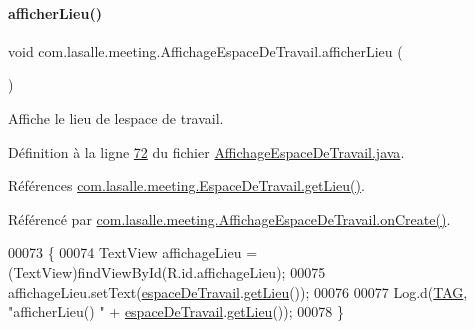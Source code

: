 \paragraph{\texorpdfstring{afficher\+Lieu()}{afficherLieu()}}
{\footnotesize\ttfamily void com.\+lasalle.\+meeting.\+Affichage\+Espace\+De\+Travail.\+afficher\+Lieu (\begin{DoxyParamCaption}{ }\end{DoxyParamCaption})}



Affiche le lieu de l\textquotesingle{}espace de travail. 



Définition à la ligne \hyperlink{_affichage_espace_de_travail_8java_source_l00072}{72} du fichier \hyperlink{_affichage_espace_de_travail_8java_source}{Affichage\+Espace\+De\+Travail.\+java}.



Références \hyperlink{_espace_de_travail_8java_source_l00092}{com.\+lasalle.\+meeting.\+Espace\+De\+Travail.\+get\+Lieu()}.



Référencé par \hyperlink{_affichage_espace_de_travail_8java_source_l00041}{com.\+lasalle.\+meeting.\+Affichage\+Espace\+De\+Travail.\+on\+Create()}.


\begin{DoxyCode}
00073     \{
00074         TextView affichageLieu = (TextView)findViewById(R.id.affichageLieu);
00075         affichageLieu.setText(\hyperlink{classcom_1_1lasalle_1_1meeting_1_1_affichage_espace_de_travail_a934d41c1c41882b94b65a95cee5aca13}{espaceDeTravail}.\hyperlink{classcom_1_1lasalle_1_1meeting_1_1_espace_de_travail_af320aa4ad7711ed52b3b5aef1bd52dd1}{getLieu}());
00076 
00077         Log.d(\hyperlink{classcom_1_1lasalle_1_1meeting_1_1_affichage_espace_de_travail_a8606eb11c7b28f52226544de431d86a4}{TAG}, \textcolor{stringliteral}{"afficherLieu() "} + \hyperlink{classcom_1_1lasalle_1_1meeting_1_1_affichage_espace_de_travail_a934d41c1c41882b94b65a95cee5aca13}{espaceDeTravail}.\hyperlink{classcom_1_1lasalle_1_1meeting_1_1_espace_de_travail_af320aa4ad7711ed52b3b5aef1bd52dd1}{getLieu}());
00078     \}
\end{DoxyCode}
\mbox{\label{classcom_1_1lasalle_1_1meeting_1_1_affichage_espace_de_travail_a62159c3fd69a3d4f03306bd3e75c09ce}} 
